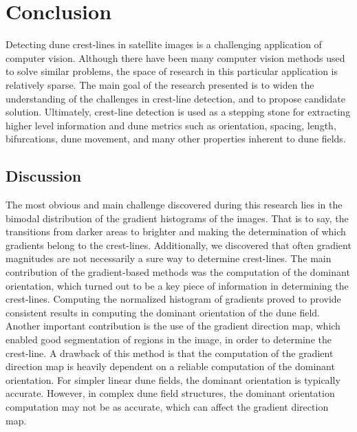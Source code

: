 \section{Conclusion} \label{sec:conclusion}

Detecting dune crest-lines in satellite images is a challenging application of computer vision. Although there have been many computer vision methods used to solve similar problems, the space of research in this particular application is relatively sparse. The main goal of the research presented is to widen the understanding of the challenges in crest-line detection, and to propose candidate solution. Ultimately, crest-line detection is used as a stepping stone for extracting higher level information and dune metrics such as orientation, spacing, length, bifurcations, dune movement, and many other properties inherent to dune fields.  

\subsection{Discussion}

The most obvious and main challenge discovered during this research lies in the bimodal distribution of the gradient histograms of the images. That is to say, the transitions from darker areas to brighter and making the determination of which gradients belong to the crest-lines. Additionally, we discovered that often gradient magnitudes are not necessarily a sure way to determine crest-lines. The main contribution of the gradient-based methods was the computation of the dominant orientation, which turned out to be a key piece of information in determining the crest-lines. Computing the normalized histogram of gradients proved to provide consistent results in computing the dominant orientation of the dune field. Another important contribution is the use of the gradient direction map, which enabled good segmentation of regions in the image, in order to determine the crest-line. A drawback of this method is that the computation of the gradient direction map is heavily dependent on a reliable computation of the dominant orientation. For simpler linear dune fields, the dominant orientation is typically accurate. However, in complex dune field structures, the dominant orientation computation may not be as accurate, which can affect the gradient direction map.

